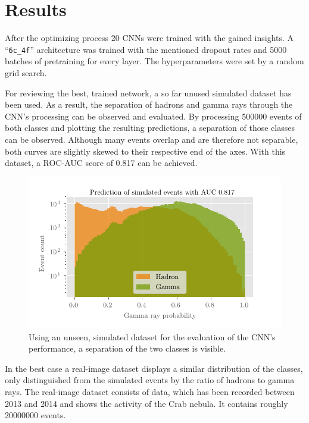 \chapter{Results}

After the optimizing process \num{20} CNNs were trained with the gained insights.
A \enquote{\texttt{6c\_4f}} architecture was trained with the mentioned dropout rates
and \num{5000} batches of pretraining for every layer.
The hyperparameters were set by a random grid search.

For reviewing the best, trained network, a so far unused simulated dataset has been used.
As a result, the separation of hadrons and gamma rays through the CNN's processing can be observed and evaluated.
By processing \num{500000} events of both classes and plotting the resulting predictions,
a separation of those classes can be observed.
Although many events overlap and are therefore not separable,
both curves are slightly skewed to their respective end of the axes.
With this dataset, a ROC-AUC score of \num{0.817} can be achieved.

\begin{figure}
    \centering
    \includegraphics[scale=1]{Plots/CNN_MC_Evaluation.pdf}
    \caption{Using an unseen, simulated dataset for the evaluation of the CNN's performance, a separation of the two classes is visible.}
    \label{fig:cnn_mc_evaluation}
\end{figure}

In the best case a real-image dataset displays a similar distribution of the classes,
only distinguished from the simulated events by the ratio of hadrons to gamma rays.
The real-image dataset consists of data,
which has been recorded between \num{2013} and \num{2014} and shows the activity of the Crab nebula.
It contains roughly \num{20000000} events.

